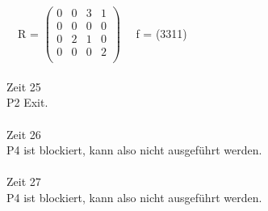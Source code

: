 \documentclass[10pt,a4paper]{scrartcl}
\begin{document}
	\ \ R =
	$\left( \begin{array}{rrrr}
	0 & 0 & 3 & 1 \\
	0 & 0 & 0 & 0 \\
	0 & 2 & 1 & 0 \\
	0 & 0 & 0 & 2 \\
	\end{array}\right) $ 
	\ \ f = (3311)
	\\\\Zeit 25\\
	P2 Exit.
	\\\\Zeit 26\\
	P4 ist blockiert, kann also nicht ausgeführt werden.
	\\\\Zeit 27\\
	P4 ist blockiert, kann also nicht ausgeführt werden.
\end{document}
